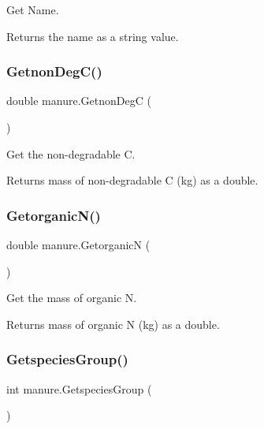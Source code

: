 Get Name. 

\begin{DoxyReturn}{Returns}
the name as a string value. 
\end{DoxyReturn}
\mbox{\label{classmanure_a601fb991bbe947332a7a55a15ff352ba}} 
\subsubsection{\texorpdfstring{GetnonDegC()}{GetnonDegC()}}
{\footnotesize\ttfamily double manure.\+Getnon\+DegC (\begin{DoxyParamCaption}{ }\end{DoxyParamCaption})\hspace{0.3cm}{\ttfamily [inline]}}



Get the non-\/degradable C. 

\begin{DoxyReturn}{Returns}
mass of non-\/degradable C (kg) as a double. 
\end{DoxyReturn}
\mbox{\label{classmanure_aaeebf31f0706d0c07683b4137df7d8dd}} 
\subsubsection{\texorpdfstring{GetorganicN()}{GetorganicN()}}
{\footnotesize\ttfamily double manure.\+GetorganicN (\begin{DoxyParamCaption}{ }\end{DoxyParamCaption})\hspace{0.3cm}{\ttfamily [inline]}}



Get the mass of organic N. 

\begin{DoxyReturn}{Returns}
mass of organic N (kg) as a double. 
\end{DoxyReturn}
\mbox{\label{classmanure_abe75269a2d8ba54fff5eb448a1d6352d}} 
\subsubsection{\texorpdfstring{GetspeciesGroup()}{GetspeciesGroup()}}
{\footnotesize\ttfamily int manure.\+Getspecies\+Group (\begin{DoxyParamCaption}{ }\end{DoxyParamCaption})\hspace{0.3cm}{\ttfamily [inline]}}



